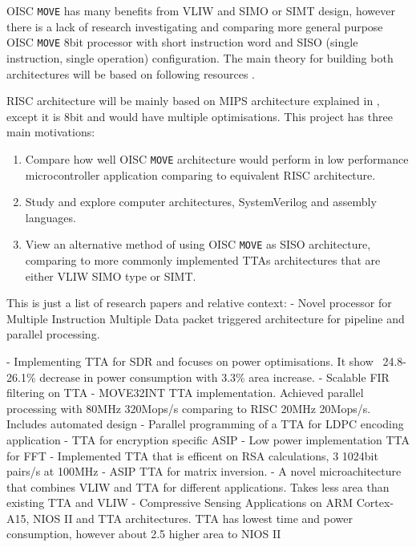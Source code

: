 \iffalse
This chapter describes your Goals and Objectives. 
Indicate how your work is intended to expand on previous historical work.
Present your motivations; why are you doing this?
Indicate the type of project you have(see the list above).

Types of Projects:
2) Design and Construction projects:
These types of projects involve the design and construction of some 
electrical or electronic apparatus or device within the bounds 
of the department's educational mandate.
\fi

OISC \texttt{MOVE} has many benefits from VLIW and SIMO or SIMT design, however there is a lack of research investigating and comparing more general purpose OISC \texttt{MOVE} 8bit processor with short instruction word and SISO (single instruction, single operation) configuration.  The main theory for building both architectures will be based on following resources \autocite{ong_ang_seng_2010,gilreath_laplante_2003,kong_ang_seng_adejo_2010,dharshana_balasubramanian_arun_2016}.

RISC architecture will be mainly based on MIPS architecture explained in \autocite{harris_harris_2013}, except it is 8bit and would have multiple optimisations. 
This project has three main motivations:
\begin{enumerate}
	\item Compare how well OISC \texttt{MOVE} architecture would perform in low performance microcontroller application comparing to equivalent RISC architecture.
	\item Study and explore computer architectures, SystemVerilog and assembly languages. 
	\item View an alternative method of using OISC \texttt{MOVE} as SISO architecture, comparing to more commonly implemented TTAs architectures that are either VLIW SIMO type or SIMT.
\end{enumerate}


\iffalse
This is just a list of research papers and relative context:
\autocite{5936440} - Novel processor for Multiple Instruction Multiple Data packet triggered architecture for pipeline and parallel processing.


\autocite{7363689} - Implementing TTA for SDR and focuses on power optimisations. It show ~24.8-26.1\% decrease in power consumption with 3.3\% area increase.
\autocite{1511285} - Scalable FIR filtering on TTA
\autocite{289981} - MOVE32INT TTA implementation. Achieved parallel processing with 80MHz 320Mops/s comparing to RISC 20MHz 20Mops/s. Includes automated design
\autocite{6855236} - Parallel programming of a TTA for LDPC encoding application
\autocite{922340} - TTA for encryption specific ASIP
\autocite{8682289} - Low power implementation TTA for FFT
\autocite{6128530} - Implemented TTA that is efficent on RSA calculations, 3 1024bit pairs/s at 100MHz
\autocite{1540373} - ASIP TTA for matrix inversion.
\autocite{6403142} - A novel microachitecture that combines VLIW and TTA for different applications. Takes less area than existing TTA and VLIW
\autocite{8573494} - Compressive Sensing Applications on ARM Cortex-A15, NIOS II and TTA architectures. TTA has lowest time and power consumption, however about 2.5 higher area to NIOS II

